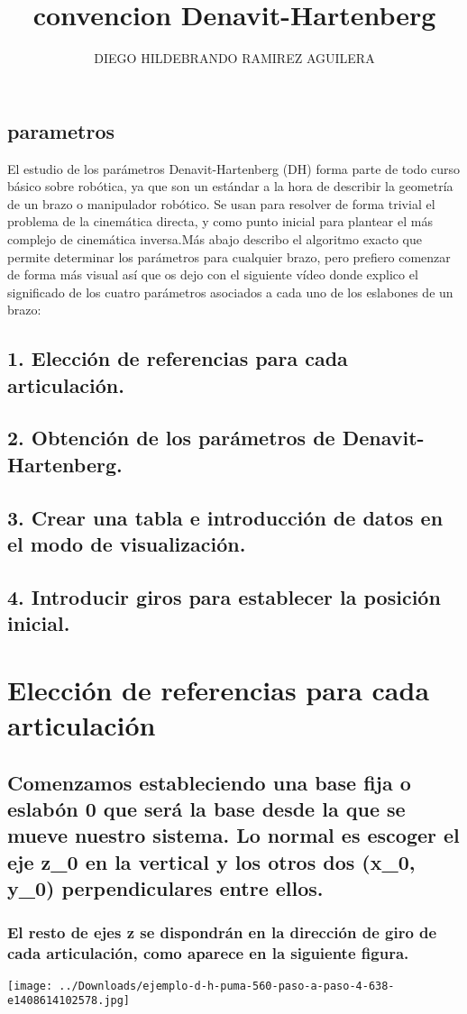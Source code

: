 \documentclass[12pt,a4paper]{article}
\author{DIEGO HILDEBRANDO RAMIREZ AGUILERA}
\title{convencion Denavit-Hartenberg}
\begin{document}
\maketitle
\clearpage
\subsection{parametros}
El estudio de los parámetros Denavit-Hartenberg (DH) forma parte de todo curso básico sobre robótica, ya que son un estándar a la hora de describir la geometría de un brazo o manipulador robótico.  Se usan para resolver de forma trivial el problema de la cinemática directa, y como punto inicial para plantear el más complejo de cinemática inversa.Más abajo describo el algoritmo exacto que permite determinar los parámetros para cualquier brazo, pero prefiero comenzar de forma más visual así que os dejo con el siguiente vídeo donde explico el significado de los cuatro parámetros asociados a cada uno de los eslabones de un brazo:
\subsection{1.	Elección de referencias para cada articulación.}
\subsection{2.	Obtención de los parámetros de Denavit-Hartenberg.}
\subsection{3.	Crear una tabla e introducción de datos en el modo de visualización.}
\subsection{4. Introducir giros para establecer la posición inicial.}
\section{Elección de referencias para cada articulación}
\subsection{Comenzamos estableciendo una base fija o eslabón 0 que será la base desde la que se mueve nuestro sistema. Lo normal es escoger el eje z_0 en la vertical y los otros dos (x_0, y_0) perpendiculares entre ellos.}

\subsubsection{El resto de ejes z se dispondrán en la dirección de giro de cada articulación, como aparece en la siguiente figura.}

\texttt{[image: ../Downloads/ejemplo-d-h-puma-560-paso-a-paso-4-638-e1408614102578.jpg]} 
\end{document}
